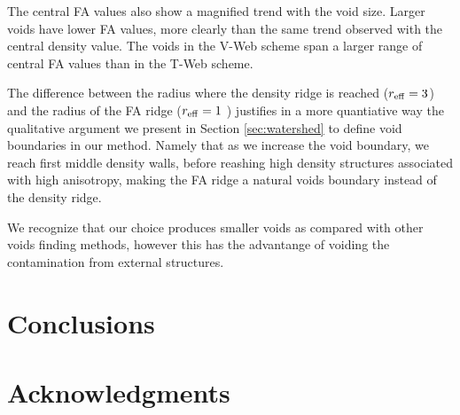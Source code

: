 \documentclass[a4,useAMS,usenatbib,usegraphicx]{mn2e}
\begin{document}
The central FA values also show a magnified trend with the void size. 
Larger voids have lower FA values, more clearly than the same trend
observed with the central density value. 
The voids in the V-Web scheme span a larger range of central FA values
than in the T-Web scheme. 

The difference between the radius where the density ridge is reached 
($r_{\rm eff}=3$) and the radius of the FA  ridge ($r_{\rm eff}=1$ )
justifies in a more quantiative way the qualitative argument
we present in Section \ref{sec:watershed} to define void boundaries in
our method.  Namely that as we increase the void boundary, we reach
first middle density walls, before reashing high density structures
associated with high anisotropy, making the FA  ridge a  natural voids
boundary instead of the density ridge.  

We recognize that our choice produces smaller voids as compared with
other voids finding methods, however this has the advantange of
voiding the contamination from external structures.


\section{Conclusions}
\label{sec:conclusions}


\section*{Acknowledgments}  



\end{document}
